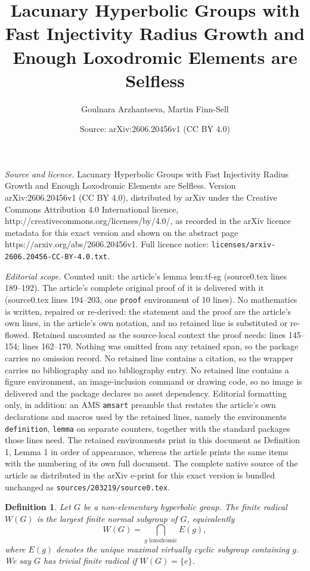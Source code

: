 \documentclass[10pt,a4paper]{amsart}
\title{Lacunary Hyperbolic Groups with Fast Injectivity Radius Growth and Enough Loxodromic Elements are Selfless}
\author{Goulnara Arzhantseva, Martin Finn-Sell}
\date{Source: arXiv:2606.20456v1 (CC BY 4.0)}
\newtheorem{definition}{Definition}
\begin{document}
\maketitle

\noindent\emph{Source and licence.} Lacunary Hyperbolic Groups with Fast Injectivity Radius Growth and Enough Loxodromic Elements are Selfless. Version arXiv:2606.20456v1 (CC BY 4.0), distributed by arXiv under the Creative Commons Attribution 4.0 International licence, http://creativecommons.org/licenses/by/4.0/, as recorded in the arXiv licence metadata for this exact version and shown on the abstract page https://arxiv.org/abs/2606.20456v1. Full licence notice: \texttt{licenses/arxiv-2606.20456-CC-BY-4.0.txt}.\par\smallskip

\noindent\textit{Editorial scope.} Counted unit: the article's lemma lem:tf-sg (source0.tex lines 189--192). The article's complete original proof of it is delivered with it (source0.tex lines 194--203, one \texttt{proof} environment of 10 lines). No mathematics is written, repaired or re-derived: the statement and the proof are the article's own lines, in the article's own notation, and no retained line is substituted or re-flowed.  Retained uncounted as the source-local context the proof needs: lines 145--154; lines 162--170.  Nothing was omitted from any retained span, so the package carries no omission record.  No retained line contains a citation, so the wrapper carries no bibliography and no bibliography entry.  No retained line contains a figure environment, an image-inclusion command or drawing code, so no image is delivered and the package declares no asset dependency.  Editorial formatting only, in addition: an AMS \texttt{amsart} preamble that restates the article's own declarations and macros used by the retained lines, namely the environments \texttt{definition}, \texttt{lemma} on separate counters, together with the standard packages those lines need.  The retained environments print in this document as Definition 1, Lemma 1 in order of appearance, whereas the article prints the same items with the numbering of its own full document.  The complete native source of the article as distributed in the arXiv e-print for this exact version is bundled unchanged as \texttt{sources/203219/source0.tex}.
\begin{definition}\label{def:W}
Let $G$ be a non-elementary hyperbolic group.
The \emph{finite radical} $W(G)$ is the largest finite normal subgroup of $G$,
equivalently
\[
  W(G) = \bigcap_{\text{$g$ loxodromic}} E(g),
\]
where $E(g)$ denotes the unique maximal virtually cyclic subgroup containing $g$.
We say $G$ has \emph{trivial finite radical} if $W(G) = \{e\}$.
\end{definition}
\end{document}
